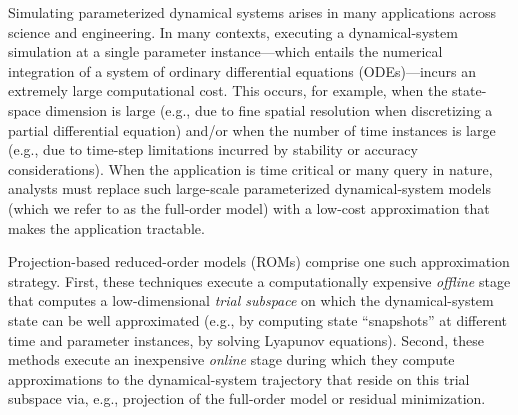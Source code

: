 \documentclass[3p,computermodern,10pt]{elsarticle}
\begin{document}
Simulating parameterized dynamical systems arises in many applications across
science and engineering. In many contexts, executing a dynamical-system
simulation at a single parameter instance---which entails the numerical
integration of a system of ordinary differential equations (ODEs)---incurs an
extremely large computational cost.  This occurs, for example, when the
state-space dimension is large (e.g., due to fine spatial resolution when
discretizing a partial differential equation) and/or when the number of time
instances is large (e.g., due to time-step limitations incurred by stability
or accuracy considerations).  When the application is time critical or many
query in nature, analysts must replace such large-scale parameterized
dynamical-system models (which we refer to as the full-order model) with a low-cost approximation that makes the
application tractable.


Projection-based reduced-order models (ROMs) comprise one such approximation
strategy. First, these techniques execute a computationally expensive
\textit{offline} stage that computes a low-dimensional \textit{trial subspace} on
which the dynamical-system state can be well approximated (e.g., by computing
state ``snapshots'' at different time and parameter instances, by solving
Lyapunov equations). Second, these methods execute an inexpensive
\textit{online} stage during which they compute approximations to the
dynamical-system trajectory that reside on this trial subspace via, e.g., 
projection of the full-order model or residual minimization. 
 
\end{document}

